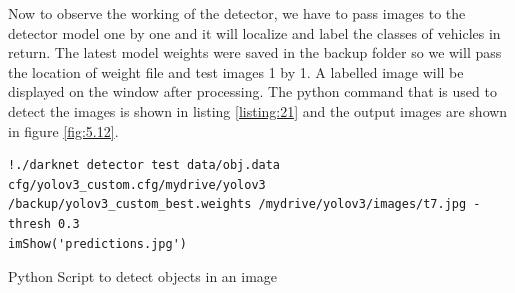 \noindent
Now to observe the working of the detector, we have to pass images to the detector model one by one and it will localize and label the classes of vehicles in return. The latest model weights were saved in the backup folder so we will pass the location of weight file and test images 1 by 1. A labelled image will be displayed on the window after processing. The python command that is used to detect the images is shown in listing \ref{listing:21} and the output images are shown in figure \ref{fig:5.12}.
\begin{longlisting}
\begin{verbatim}
!./darknet detector test data/obj.data cfg/yolov3_custom.cfg/mydrive/yolov3
/backup/yolov3_custom_best.weights /mydrive/yolov3/images/t7.jpg -thresh 0.3
imShow('predictions.jpg')
\end{verbatim}
\caption{Python Script to detect objects in an image}
\label{listing:21}
\end{longlisting}
